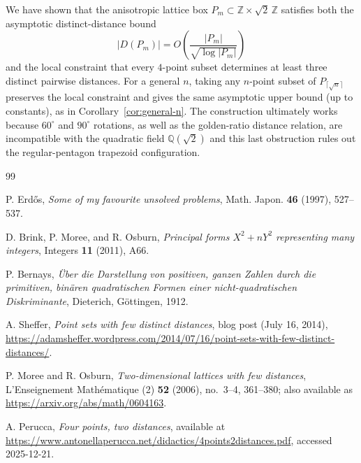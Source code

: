 \documentclass[11pt, reqno]{amsart}
\theoremstyle{definition}
\theoremstyle{remark}
\newcommand{\Q}{\mathbb{Q}}
\newcommand{\Z}{\mathbb{Z}}
\begin{document}
We have shown that the anisotropic lattice box $P_m \subset \Z \times \sqrt2\,\Z$ satisfies both the asymptotic
distinct-distance bound
\[
|D(P_m)| = O(\frac{|P_m|}{\sqrt{\log |P_m|}})
\]
and the local constraint that every $4$-point subset determines at least three distinct pairwise distances. For a general $n$,
taking any $n$-point subset of $P_{\lceil\sqrt n\rceil}$ preserves the local constraint and gives the same asymptotic
upper bound (up to constants), as in Corollary~\ref{cor:general-n}. The construction ultimately works because $60^\circ$ and $90^\circ$ rotations, as well as the golden-ratio distance relation, are incompatible with the quadratic field
$\Q(\sqrt2)$ and this last obstruction rules out the regular-pentagon trapezoid configuration.


\begin{thebibliography}{99}

P. Erd\H{o}s,
\textit{Some of my favourite unsolved problems},
Math. Japon. \textbf{46} (1997), 527--537.

D. Brink, P. Moree, and R. Osburn,
\textit{Principal forms $X^2+nY^2$ representing many integers},
Integers \textbf{11} (2011), A66.

P. Bernays,
\textit{\"Uber die Darstellung von positiven, ganzen Zahlen durch die primitiven, bin\"aren quadratischen Formen einer nicht-quadratischen Diskriminante},
Dieterich, G\"ottingen, 1912.

A. Sheffer,
\textit{Point sets with few distinct distances},
blog post (July 16, 2014),
\url{https://adamsheffer.wordpress.com/2014/07/16/point-sets-with-few-distinct-distances/}.

P. Moree and R. Osburn,
\textit{Two-dimensional lattices with few distances},
L'Enseignement Math\'ematique (2) \textbf{52} (2006), no.~3--4, 361--380;
also available as \url{https://arxiv.org/abs/math/0604163}.

A. Perucca,
\textit{Four points, two distances},
available at \url{https://www.antonellaperucca.net/didactics/4points2distances.pdf},
accessed 2025-12-21.


\end{thebibliography}
\end{document}
